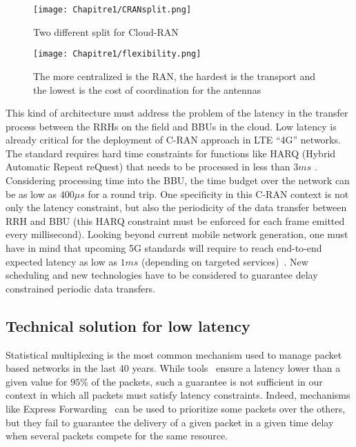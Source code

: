    \begin{figure}[h]
      \begin{center}
      \texttt{[image: Chapitre1/CRANsplit.png]}
      \end{center}
      \caption{Two different split for Cloud-RAN}\label{fig:CRANsplit}
      \end{figure}
      \begin{figure}[h]
      \begin{center}
      \texttt{[image: Chapitre1/flexibility.png]}
      \end{center}
      \caption{The more centralized is the RAN, the hardest is the transport and the lowest is the cost of coordination for the antennas}\label{fig:flexibility}
      \end{figure}
       
This kind of architecture must address the problem of the latency in the transfer process between the RRHs on the field and BBUs in the cloud. Low latency is already critical for the deployment of C-RAN approach in LTE “4G” networks. The standard requires hard time constraints for functions like HARQ (Hybrid Automatic Repeat reQuest) that needs to be processed in less than $3ms$ \cite{bouguen2012lte}. Considering processing time into the BBU, the time budget over the network can be as low as $400\mu s$ for a round trip. One specificity in this C-RAN context is not only the latency constraint, but also the periodicity of the data transfer between RRH and BBU (this HARQ constraint must be enforced for each frame emitted every millisecond). Looking beyond current mobile network generation, one must have in mind that upcoming 5G standards will require to reach end-to-end expected latency as low as $1ms$ (depending on targeted services)~\cite{boccardi2014five}. New scheduling and new technologies have to be considered to guarantee delay constrained periodic data transfers. 


\subsection{Technical solution for low latency}

Statistical multiplexing is the most common mechanism used to manage packet based networks in the last $40$ years. While tools~\cite{metricsietf} ensure a latency lower than a given value for $95\%$ of the packets, such a guarantee is not sufficient in our context in which all packets must satisfy latency constraints. Indeed, mechanisms like Express Forwarding~\cite{exprforw} can be used to prioritize some packets over the others, but they fail to guarantee the delivery of a given packet in a given time delay when several packets compete for the same resource. 



